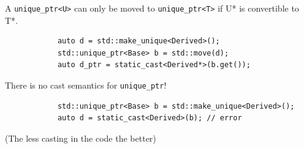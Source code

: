 \documentclass{beamer}
\begin{document}
\begin{frame}[fragile]
	A \texttt{unique\_ptr<U>} can only be moved to \texttt{unique\_ptr<T>} if U* is convertible to T*.
	\begin{example}
		\begin{lstlisting}
			auto d = std::make_unique<Derived>();
			std::unique_ptr<Base> b = std::move(d);
			auto d_ptr = static_cast<Derived*>(b.get());
		\end{lstlisting}
	\end{example}
	There is no cast semantics for \texttt{unique\_ptr}!
	\begin{example}
		\begin{lstlisting}
			std::unique_ptr<Base> b = std::make_unique<Derived>();
			auto d = static_cast<Derived>(b); // error
		\end{lstlisting}
	\end{example}
\end{frame}

\begin{frame}
    \begin{center}
        (The less casting in the code the better)
    \end{center}
\end{frame}
\end{document}
